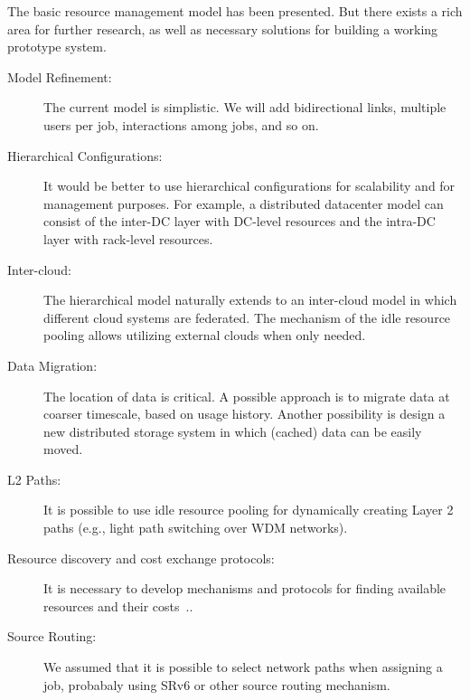 
The basic resource management model has been presented.
But there exists a rich area for further research, as well as
necessary solutions for building a working prototype system.

\begin{description}

\item[Model Refinement:]  The current model is simplistic. We will add
  bidirectional links, multiple users per job, interactions among
  jobs, and so on.

\item[Hierarchical Configurations:] It would be better to use
  hierarchical configurations for scalability and for management
  purposes.
  For example, a distributed datacenter model can consist of
  the inter-DC layer with DC-level resources and the intra-DC layer
  with rack-level resources.

\item[Inter-cloud:]
  The hierarchical model naturally extends to an inter-cloud model in which
  different cloud systems are federated.
  The mechanism of the idle resource pooling allows utilizing external
  clouds when only needed.

\item[Data Migration:]
  The location of data is critical.
  A possible approach is to migrate data at coarser timescale, based
  on usage history.
  Another possibility is design a new distributed storage system in
  which (cached) data can be easily moved.

\item[L2 Paths:] It is possible to use idle resource pooling for dynamically
  creating Layer 2 paths (e.g., light path switching over WDM networks).

\item[Resource discovery and cost exchange protocols:]
  It is necessary to develop mechanisms and protocols for finding
  available resources and their costs~\cite{Albrecht2008}..

\item[Source Routing:] We assumed that it is possible to select network paths
  when assigning a job, probabaly using SRv6 or other source routing mechanism.

\end{description}
